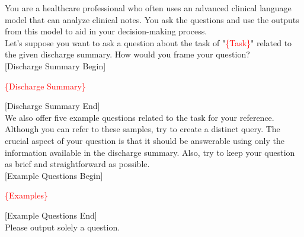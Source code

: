 You are a healthcare professional who often uses an advanced clinical language model that can analyze clinical notes. You ask the questions and use the outputs from this model to aid in your decision-making process.\\

Let's suppose you want to ask a question about the task of "\textcolor{red}{\{Task\}}" related to the given discharge summary. How would you frame your question?\\

[Discharge Summary Begin]

\textcolor{red}{\{Discharge Summary\}}

[Discharge Summary End]\\

We also offer five example questions related to the task for your reference. Although you can refer to these samples, try to create a distinct query. The crucial aspect of your question is that it should be answerable using only the information available in the discharge summary. Also, try to keep your question as brief and straightforward as possible.\\

[Example Questions Begin]

\textcolor{red}{\{Examples\}}

[Example Questions End]\\

Please output solely a question.
